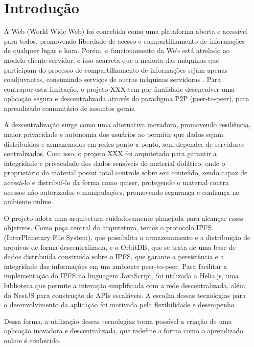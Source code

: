 \chapter[Introdução]{Introdução}
A Web (World Wide Web) foi concebida como uma plataforma aberta e acessível para todos, promovendo liberdade de acesso e compartilhamento de informações de qualquer lugar e hora. 
Porém, o funcionamento da Web está atrelado ao modelo cliente-servidor, e isso acarreta que a maioria das máquinas que participam do processo de compartilhamento de informações sejam apenas coadjuvantes, consumindo serviços de outras máquinas servidoras \cite{rocha2004p2p}. Para contrapor esta limitação, o projeto XXX tem por finalidade desenvolver uma aplicação segura e descentralizada através do paradigma P2P (peer-to-peer), para aprendizado comunitário de assuntos gerais.

A descentralização surge como uma alternativa inovadora, promovendo resiliência, maior privacidade e autonomia dos usuários ao permitir que dados sejam distribuídos e armazenados em redes ponto a ponto, sem depender de servidores centralizados. Com isso, o projeto XXX foi arquitetado para garantir a integridade e privacidade dos dados sensíveis do material didático, onde o proprietário do material possui total controle sobre seu conteúdo, sendo capaz de acessá-lo e distribuí-lo da forma como quiser, protegendo o material contra acessos não autorizados e manipulações, promovendo segurança e confiança no ambiente online.

O projeto adota uma arquitetura cuidadosamente planejada para alcançar esses objetivos. Como peça central da arquitetura, temos o protocolo IPFS (InterPlanetary File System), que possibilita o armazenamento e a distribuição de arquivos de forma descentralizada, e o OrbitDB, que se trata de uma base de dados distribuída construída sobre o IPFS, que garante a persistência e a integridade das informações em um ambiente peer-to-peer. Para facilitar a implementação do IPFS na linguagem JavaScript, foi utilizada a Helia,js, uma biblioteca que permite a interação simplificada com a rede descentralizada, além do NestJS para construção de APIs escaláveis. A escolha dessas tecnologias para o desenvolvimento da aplicação foi motivada pela flexibilidade e desempenho.

Dessa forma, a utilização dessas tecnologias torna possível a criação de uma aplicação inovadora e descentralizada, que redefine a forma como o aprendizado online é conhecido.

